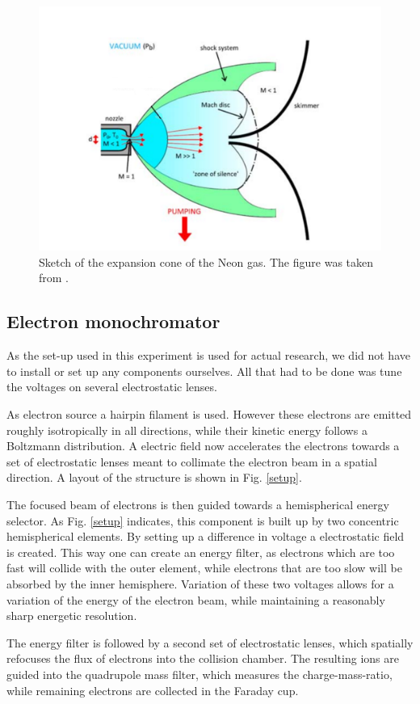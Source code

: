 \documentclass[a4paper,10pt]{article}
\begin{document}
\begin{figure}[htp!]
	\centering
	\includegraphics[width = 0.6 \textwidth]{expansion.png}
	\caption{Sketch of the expansion cone of the Neon gas. The figure was taken from \cite{script}. }
	\label{fig_expansion}
\end{figure}

\subsection{Electron monochromator}

As the set-up used in this experiment is used for actual research, we did not have to install or set up any components ourselves. All that had to be done was tune the voltages on several electrostatic lenses. 

As electron source a hairpin filament is used. However these electrons are emitted roughly isotropically in all directions, while their kinetic energy follows a Boltzmann distribution. A electric field now accelerates the electrons towards a set of electrostatic lenses meant to collimate the electron beam in a spatial direction. A layout of the structure is shown in Fig. \ref{setup}. 

The focused beam of electrons is then guided towards a hemispherical energy selector. As Fig. \ref{setup} indicates, this component is built up by two concentric hemispherical elements. By setting up a difference in voltage a electrostatic field is created. This way one can create an energy filter, as electrons which are too fast will collide with the outer element, while electrons that are too slow will be absorbed by the inner hemisphere. Variation of these two voltages allows for a variation of the energy of the electron beam, while maintaining a reasonably sharp energetic resolution. 

The energy filter is followed by a second set of electrostatic lenses, which spatially refocuses the flux of electrons into the collision chamber. The resulting ions are guided into the quadrupole mass filter, which measures the charge-mass-ratio, while remaining electrons are collected in the Faraday cup.
\end{document}

